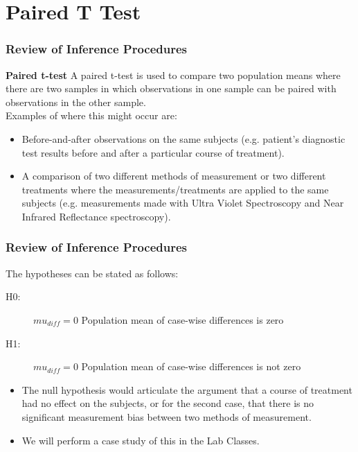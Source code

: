 \documentclass{beamer}
\begin{document}
\section{Paired T Test}
\begin{frame}
\frametitle{Review of Inference Procedures}
\large
\noindent \textbf{Paired t-test}
A paired t-test is used to compare two population means where
there are two samples in which observations in one sample can be
paired with observations in the other sample.\\ \smallskip
			Examples of where this might occur are:
			\begin{itemize}
				\item Before-and-after observations on the same subjects (e.g.
				patient’s diagnostic test results before and after a particular
				course of treatment).
				\item A comparison of two different methods of measurement or
				two different treatments where the measurements/treatments
				are applied to the same subjects (e.g. measurements made
				with Ultra Violet Spectroscopy and Near Infrared Reflectance
				spectroscopy).
\end{itemize}
			
			
\end{frame}
\begin{frame}
\frametitle{Review of Inference Procedures}
			\large
			The hypotheses can be stated as follows:
			\begin{description}
				\item[H0:] $mu_{diff} =0$ Population mean of case-wise differences is zero
				\item[H1:] $mu_{diff} =0$\label{$mu_{diff}$ ≠ 0} Population mean of case-wise differences is not zero
			\end{description}
			\begin{itemize}
				\item The null hypothesis would articulate the argument that a course of
				treatment had no effect on the subjects, or for the second case,
				that there is no significant measurement bias between two methods
				of measurement.
				\item We will perform a case study of this in the Lab Classes.
			\end{itemize}
		\end{frame}
	
\end{document}
